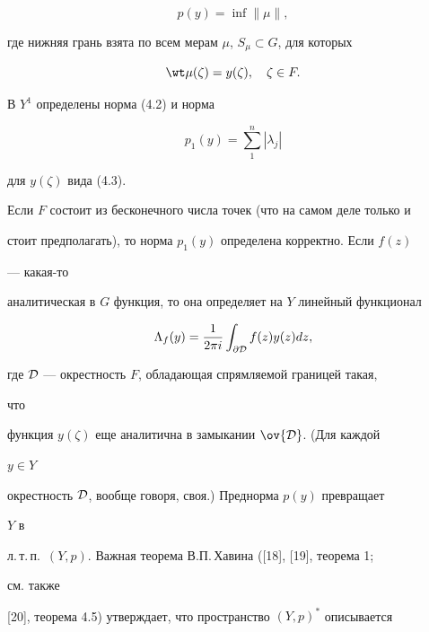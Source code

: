 \begin{equation} 


p(y)=\inf\|\mu\|, 


\end{equation} 


где нижняя грань взята по всем мерам $\mu$, $S_\mu\subset G$, для которых 


\begin{equation} 


\wt \mu(\zeta)=y(\zeta),\quad \zeta\in F. 


\end{equation} 


В $Y^1$ определены норма (4.2) и норма 


\begin{equation} 


p_1(y)=\sum^n_1|\lambda_j| 


\end{equation} 


для $y(\zeta)$ вида (4.3). 


Если $F$ состоит из бесконечного числа точек (что на самом деле только и 


стоит предполагать), то норма $p_1(y)$ определена корректно. Если $f(z)$ 


--- какая-то 


аналитическая в $G$ функция, то она определяет на $Y$ линейный функционал 


\begin{equation} 


\Lambda_f(y)=\frac{1}{2\pi i}\int_{\partial \cal D} 


f(z)y(z)d z, 


\end{equation} 


где $\cal D$ --- окрестность $F$, обладающая спрямляемой границей такая, 


что 


функция $y(\zeta)$ еще аналитична в замыкании $\ov{\cal D}$. (Для каждой 


$y\in Y$ 


окрестность $\cal D$, вообще говоря, своя.) Преднорма $p(y)$ превращает 


$Y$ в 


л.\,т.\,п.\ $(Y,p)$. Важная теорема В.П.\,Хавина ([18], [19], теорема 1; 


см. также 


[20], теорема 4.5) утверждает, что пространство $(Y,p)^*$ описывается 


